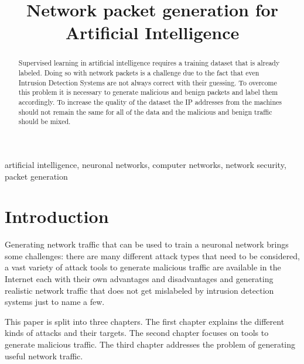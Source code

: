 \documentclass[conference]{IEEEtran}
\begin{document}
\title{Network packet generation for Artificial Intelligence\\
}

\author{
\and
{}
}

\maketitle

\begin{abstract}
Supervised learning in artificial intelligence requires a training dataset that is already labeled. Doing so with network packets is a challenge due to the fact that even Intrusion Detection Systems are not always correct with their guessing. To overcome this problem it is necessary to generate malicious and benign packets and label them accordingly. To increase the quality of the dataset the IP addresses from the machines should not remain the same for all of the data and the malicious and benign traffic should be mixed.

\end{abstract}

\begin{IEEEkeywords}
artificial intelligence, neuronal networks, computer networks, network security, packet generation
\end{IEEEkeywords}

\section{Introduction}
Generating network traffic that can be used to train a neuronal network brings some challenges: there are many different attack types that need to be considered, a vast variety of attack tools to generate malicious traffic are available in the Internet each with their own advantages and disadvantages and generating realistic network traffic that does not get mislabeled by intrusion detection systems just to name a few. 

This paper is split into three chapters. The first chapter explains the different kinds of attacks and their targets. The second chapter focuses on tools to generate malicious traffic. The third chapter addresses the problem of generating useful network traffic.
\end{document}
